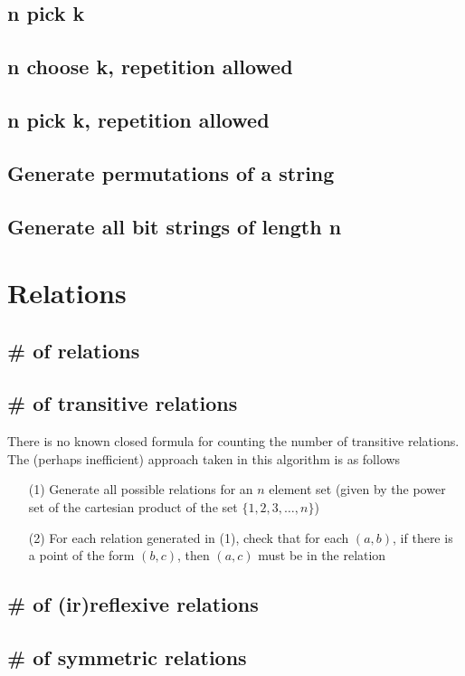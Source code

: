 \documentclass{article}
\begin{document}
\subsection{n pick k}
\subsection{n choose k, repetition allowed}
\subsection{n pick k, repetition allowed}
\subsection{Generate permutations of a string}
\subsection{Generate all bit strings of length n}

\section{Relations}
\subsection{\# of relations}
\subsection{\# of transitive relations}
There is no known closed formula for counting the number of transitive relations. The (perhaps inefficient) approach taken in this algorithm is as follows
\begin{enumerate}
\item[(1)] Generate all possible relations for an $n$ element set (given by the power set of the cartesian product of the set $\{1,2,3,\dots,n\}$)
\item[(2)] For each relation generated in (1), check that for each $(a,b)$, if there is a point of the form $(b,c)$, then $(a,c)$ must be in the relation
\end{enumerate}
\subsection{\# of (ir)reflexive relations}
\subsection{\# of symmetric relations}
\end{document}
